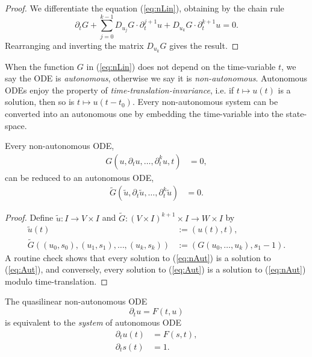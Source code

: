 \begin{proof}
	We differentiate the equation (\ref{eq:nLin}), obtaining by the chain rule
		\[ \partial_t G + \sum_{j = 0}^{k - 1} D_{u_j} G \cdot \partial_t^{j + 1} u + D_{u_k} G \cdot \partial_t^{k + 1} u = 0.\]
	Rearranging and inverting the matrix $D_{u_k} G$ gives the result. 	
\end{proof}


When the function $G$ in (\ref{eq:nLin}) does not depend on the time-variable $t$, we say the ODE is \emph{autonomous}, otherwise we say it is \emph{non-autonomous}. Autonomous ODEs enjoy the property of \textit{time-translation-invariance}, i.e. if $t \mapsto u(t)$ is a solution, then so is $t \mapsto u(t - t_0)$. Every non-autonomous system can be converted into an autonomous one by embedding the time-variable into the state-space. 

\begin{proposition}
	Every non-autonomous ODE,
		\begin{align}
			G(u, \partial_t u, \dots, \partial_t^k u, t) 
			&= 0,\tag{nAut}\label{eq:nAut}
		\end{align}	
	can be reduced to an autonomous ODE,
		\begin{align}
			\widetilde G(\widetilde u, \partial_t \widetilde u, \dots, \partial_t^k \widetilde u)
			&= 0. \tag{Aut}\label{eq:Aut}
		\end{align}	
\end{proposition}

\begin{proof}
	Define $\widetilde u : I \to V \times I$ and $\widetilde G : (V \times I)^{k + 1} \times I \to W \times I$ by 
		\begin{align*}
			\widetilde u (t)
				&:= (u(t), t),\\
			\widetilde G((u_0, s_0), (u_1, s_1), \dots, (u_k, s_k))
				&:= (G(u_0, \dots, u_k), s_1 - 1).
		\end{align*}
	A routine check shows that every solution to (\ref{eq:nAut}) is a solution to (\ref{eq:Aut}), and conversely, every solution to (\ref{eq:Aut}) is a solution to (\ref{eq:nAut}) modulo time-translation. 
\end{proof}



\begin{example}
	The quasilinear non-autonomous ODE
		\[ \partial_t u = F(t, u) \]
	is equivalent to the \textit{system} of autonomous ODE
		\begin{align*}
			\partial_t u(t) 
				&= F(s, t), \\
			\partial_t s(t)
				&= 1. 	
		\end{align*}
\end{example}


